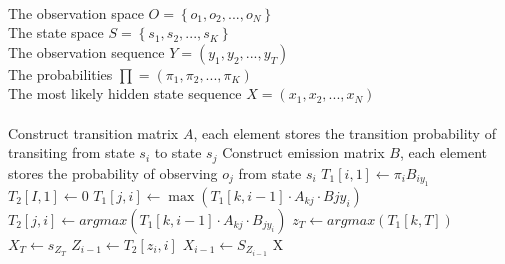 \documentclass[sigconf]{acmart}
\begin{document}
\begin{algorithm}[t]
	\caption{\textbf{Viterbi algorithm for CRF-ASN}}
	\begin{algorithmic}[1]
		\REQUIRE ~~\\ %
	    The observation space $O=\left\lbrace o_1,o_2,...,o_N\right\rbrace $ \\
	    The state space $S=\left\lbrace s_1,s_2,...,s_K\right\rbrace $ \\
		The observation sequence $Y=(y_1,y_2,...,y_T)$ \\
	    The probabilities $\prod=(\pi_1,\pi_2,...,\pi_K)$
	    \ENSURE ~~\\
	    The most likely hidden state sequence $X=(x_1,x_2,...,x_N)$ \\
	    ~~\\
	    \STATE Construct transition matrix $A$, each element stores the transition probability of transiting from state $s_i$ to state $s_j$
	    \STATE Construct emission matrix $B$, each element stores the probability of observing $o_j$ from state $s_i$
 		       \STATE $T_1[i,1]\leftarrow\pi_i B_{iy_1}$
               \STATE $T_2[I,1]\leftarrow 0$ 		
		\ENDFOR
	                   \STATE $T_1[j,i] \leftarrow \max(T_1[k,i-1]\cdot A_{kj}\cdot B{jy_i})$    
                       \STATE $T_2[j,i] \leftarrow argmax(T_1[k,i-1]\cdot A_{kj}\cdot B_{jy_i})$                                                       	           
	           \ENDFOR
		\ENDFOR
		\STATE $z_T \leftarrow argmax(T_1[k,T])$
		\STATE $X_T \leftarrow s_{Z_T} $
		      \STATE $Z_{i-1} \leftarrow T_2[z_i,i]$ 
		      \STATE $X_{i-1} \leftarrow S_{Z_{i-1}}$
		\ENDFOR
		\RETURN X
	\end{algorithmic}
\end{algorithm}
\end{document}
